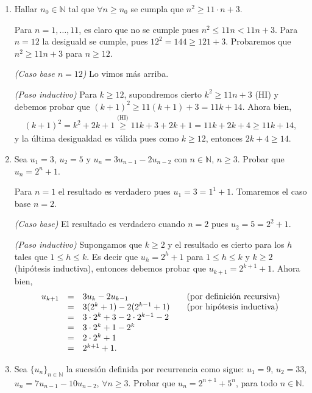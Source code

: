 \begin{enumerate}
    \item Hallar $n_0 \in {\mathbb N}$ tal que $\forall n \ge n_0$ se cumpla que $n^2 \ge 11 \cdot n + 3$.
    
    \rta Para $n=1,\ldots,11$,  es claro que no se cumple pues $n^2 \le 11n < 11n +3$. Para $n =12$ la desiguald se cumple, pues $12^2 = 144 \ge 121+3$.   Probaremos  que $n^2 \ge 11  n + 3$ para $n\ge 12$. 
    
        \textit{(Caso base $n=12$)} Lo vimos más arriba.
        
        \textit{(Paso inductivo)}  Para  $k \ge 12$,  supondremos cierto $k^2 \ge 11  n + 3$ (HI) y debemos probar que $(k+1)^2 \ge 11  (k+1) + 3 =11k +14$. Ahora bien, 
        \begin{align*}
            (k+1)^2 = k^2+2k+1 \overset{\text{(HI)}}{\ge} 11k+3 +2k+1 = 11k + 2k+ 4 \ge 11k +14, 
        \end{align*}
        y la última desigualdad es válida pues como  $k\ge 12$,  entonces $2k+ 4 \ge 14$.
    
    \item Sea $u_1=3$, $u_2=5$ y $u_n=3 u_{n-1} - 2 u_{n-2}$ con $n\in \mathbb N$, $n\geq 3$.
    Probar que $u_n=2^n+1$.
    
    \rta Para $n=1$ el resultado es verdadero pues $u_1 =3 = 1^1 +1$. Tomaremos el caso  base $n=2$.
    
    \textit{(Caso  base) } El resultado es verdadero cuando  $n=2$ pues $u_2 = 5 =2^2+1$.
    
    \textit{(Paso  inductivo)} Supongamos que $k \ge 2$ y el resultado  es cierto para los $h$ tales que  $1 \le h \le k$. Es decir que $u_h = 2^h+1$ para $1 \le h \le k$ y $k \ge 2$ (hipótesis inductiva),  entonces debemos probar que $u_{k+1} = 2^{k+1}+1$. Ahora bien, 
    $$
    \begin{matrix} u_{k+1} &=& 3u_k -2u_{k-1} \hfill &\quad \text{(por definición recursiva)} \hfill \\
    &=& 3(2^k+1)-2(2^{k-1}+1) \hfill &\quad \text{(por hipótesis inductiva})\hfill \\
    &=& 3\cdot 2^k+3-2\cdot 2^{k-1}-2 \hfill & \\
    &=& 3\cdot 2^k+1- 2^{k} \hfill & \\
    &=& 2\cdot 2^k+1 \hfill & \\
    &=& 2^{k+1}+1. \hfill & 
    \end{matrix}
    $$
    

    \item Sea $\{ u_n \}_{n \in \mathbb N}$ la sucesión definida por recurrencia como sigue: $u_1 = 9$, $u_2 = 33$, $u_n = 7u_{n-1} - 10u_{n-2}$, $\forall n \geq 3$. Probar que $u_n = 2^{n+1} + 5^n$, para todo $n \in \mathbb N$.
    

\end{enumerate}
